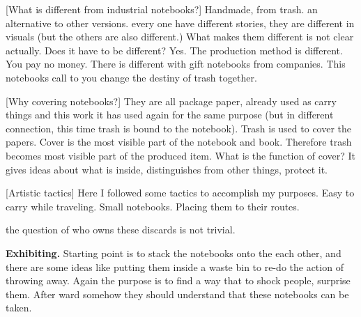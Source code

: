 [What is different from industrial notebooks?] Handmade, from trash. an alternative to other versions. every one have different stories, they are different in visuals (but the others are also different.) What makes them different is not clear actually. Does it have to be different? Yes. The production method is different. You pay no money. There is different with gift notebooks from companies. This notebooks call to you change the destiny of trash together. 

[Why covering notebooks?] They are all package paper, already used as carry things and this work it has used again for the same purpose (but in different connection, this time trash is bound to the notebook). Trash is used to cover the papers. Cover is the most visible part of the notebook and book. Therefore trash becomes most visible part of the produced item. What is the function of cover? It gives ideas about what is inside, distinguishes from other things, protect it.

[Artistic tactics] Here I followed some tactics to accomplish my purposes. Easy to carry while traveling. Small notebooks. Placing them to their routes. 



the question of who owns these discards is not trivial. \cite{zimring2012encyclopedia}





%
%
\textbf{Exhibiting.} Starting point is to stack the notebooks onto the each other, and there are some ideas like putting them inside a waste bin to re-do the action of throwing away. Again the purpose is to find a way that to shock people, surprise them. After ward somehow they should understand that these notebooks can be taken. 


